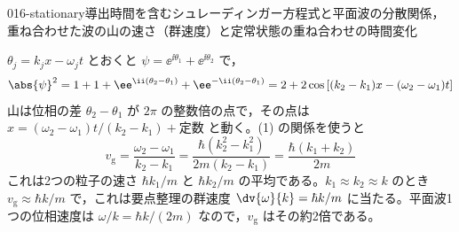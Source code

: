 \documentclass[uplatex,dvipdfmx,a4paper,11pt]{jsarticle}
\begin{document}
\begin{mondai}{016-stationary}{導出}{時間を含むシュレーディンガー方程式と平面波の分散関係，重ね合わせた波の山の速さ（群速度）と定常状態の重ね合わせの時間変化}
\begin{tadashii}
 $\theta_{j}=k_{j}x-\omega_{j}t$ とおくと $\psi=\ee^{\ii\theta_{1}}+\ee^{\ii\theta_{2}}$ で，
\[ \abs{\psi}^{2}=1+1+\ee^{\ii(\theta_{2}-\theta_{1})}+\ee^{-\ii(\theta_{2}-\theta_{1})}=2+2\cos\left[(k_{2}-k_{1})x-(\omega_{2}-\omega_{1})t\right] \]
山は位相の差 $\theta_{2}-\theta_{1}$ が $2\pi$ の整数倍の点で，その点は $x=(\omega_{2}-\omega_{1})t/(k_{2}-k_{1})+\text{定数}$ と動く。(1) の関係を使うと
\[ v_{\mathrm{g}}=\frac{\omega_{2}-\omega_{1}}{k_{2}-k_{1}}=\frac{\hbar(k_{2}^{2}-k_{1}^{2})}{2m(k_{2}-k_{1})}=\frac{\hbar(k_{1}+k_{2})}{2m} \]
これは2つの粒子の速さ $\hbar k_{1}/m$ と $\hbar k_{2}/m$ の平均である。$k_{1}\approx k_{2}\approx k$ のとき $v_{\mathrm{g}}\approx\hbar k/m$ で，これは要点整理の群速度 $\dv{\omega}{k}=\hbar k/m$ に当たる。平面波1つの位相速度は $\omega/k=\hbar k/(2m)$ なので，$v_{\mathrm{g}}$ はその約2倍である。


\end{tadashii}
\end{mondai}
\end{document}
